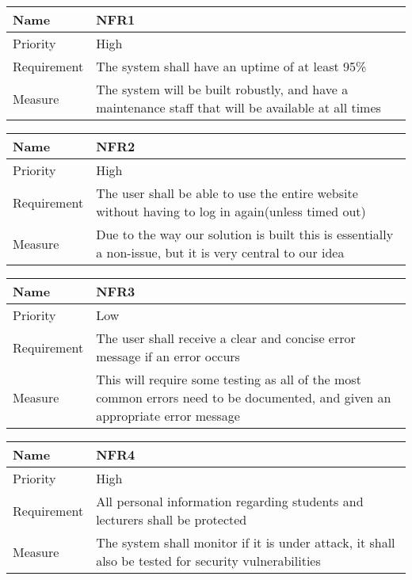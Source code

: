 \begin{tabularx}{\textwidth}{|l|X|}
  \hline
  Name & NFR1 \\ \hline
  Priority & High \\ \hline
  Requirement & The system shall have an uptime of at least 95\% \\ \hline
  Measure & The system will be built robustly, and have a maintenance staff that will be available at all times \\ \hline
\end{tabularx}

\begin{tabularx}{\textwidth}{|l|X|}
  \hline
  Name & NFR2 \\ \hline
  Priority & High \\ \hline
  Requirement & The user shall be able to use the entire website without having to log in again(unless timed out) \\ \hline
  Measure & Due to the way our solution is built this is essentially a non-issue, but it is very central to our idea \\ \hline
\end{tabularx}

\begin{tabularx}{\textwidth}{|l|X|}
  \hline
  Name & NFR3 \\ \hline
  Priority & Low \\ \hline
  Requirement & The user shall receive a clear and concise error message if an error occurs \\ \hline
  Measure & This will require some testing as all of the most common errors need to be documented, and given an appropriate error message \\ \hline
\end{tabularx}

\begin{tabularx}{\textwidth}{|l|X|}
  \hline
  Name & NFR4 \\ \hline
  Priority & High \\ \hline
  Requirement & All personal information regarding students and lecturers shall be protected \\ \hline
  Measure & The system shall monitor if it is under attack, it shall also be tested for security vulnerabilities \\ \hline
\end{tabularx}